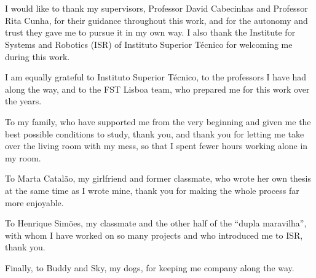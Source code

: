 
\section*{\acknowledgments}


I would like to thank my supervisors, Professor David Cabecinhas and Professor Rita Cunha, for their guidance throughout this work, and for the autonomy and trust they gave me to pursue it in my own way. I also thank the Institute for Systems and Robotics (ISR) of Instituto Superior T\'{e}cnico for welcoming me during this work.

I am equally grateful to Instituto Superior T\'{e}cnico, to the professors I have had along the way, and to the FST Lisboa team, who prepared me for this work over the years.

To my family, who have supported me from the very beginning and given me the best possible conditions to study, thank you, and thank you for letting me take over the living room with my mess, so that I spent fewer hours working alone in my room.

To Marta Catalão, my girlfriend and former classmate, who wrote her own thesis at the same time as I wrote mine, thank you for making the whole process far more enjoyable.

To Henrique Simões, my classmate and the other half of the ``dupla maravilha'', with whom I have worked on so many projects and who introduced me to ISR, thank you.

Finally, to Buddy and Sky, my dogs, for keeping me company along the way.
